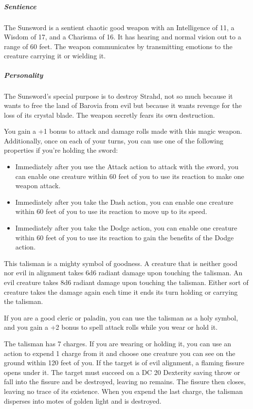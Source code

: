 \documentclass[10pt,a4paper,twoside,bg=print,twocolumn,openany,nodeprecatedcode]{dndbook}
\begin{document}
\subparagraph{Sentience}
The Sunsword is a sentient chaotic good weapon with an Intelligence of 11, a Wisdom of 17, and a Charisma of 16. It has hearing and normal vision out to a range of 60 feet. The weapon communicates by transmitting emotions to the creature carrying it or wielding it.

\subparagraph{Personality}
The Sunsword's special purpose is to destroy Strahd, not so much because it wants to free the land of Barovia from evil but because it wants revenge for the loss of its crystal blade. The weapon secretly fears its own destruction.

You gain a +1 bonus to attack and damage rolls made with this magic weapon. Additionally, once on each of your turns, you can use one of the following properties if you're holding the sword:


\begin{itemize}
\item Immediately after you use the Attack action to attack with the sword, you can enable one creature within 60 feet of you to use its reaction to make one weapon attack.
\item Immediately after you take the Dash action, you can enable one creature within 60 feet of you to use its reaction to move up to its speed.
\item Immediately after you take the Dodge action, you can enable one creature within 60 feet of you to use its reaction to gain the benefits of the Dodge action.
\end{itemize}

This talisman is a mighty symbol of goodness. A creature that is neither good nor evil in alignment takes 6d6 radiant damage upon touching the talisman. An evil creature takes 8d6 radiant damage upon touching the talisman. Either sort of creature takes the damage again each time it ends its turn holding or carrying the talisman.

If you are a good cleric or paladin, you can use the talisman as a holy symbol, and you gain a +2 bonus to spell attack rolls while you wear or hold it.

The talisman has 7 charges. If you are wearing or holding it, you can use an action to expend 1 charge from it and choose one creature you can see on the ground within 120 feet of you. If the target is of evil alignment, a flaming fissure opens under it. The target must succeed on a DC 20 Dexterity saving throw or fall into the fissure and be destroyed, leaving no remains. The fissure then closes, leaving no trace of its existence. When you expend the last charge, the talisman disperses into motes of golden light and is destroyed.
\end{document}
